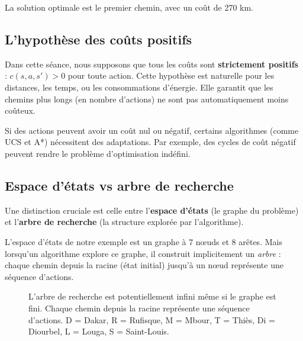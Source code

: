 \documentclass[11pt,a4paper]{article}
\begin{document}
La solution optimale est le premier chemin, avec un coût de 270 km.

\subsection{L'hypothèse des coûts positifs}

Dans cette séance, nous supposons que tous les coûts sont \textbf{strictement positifs} : $c(s, a, s') > 0$ pour toute action. Cette hypothèse est naturelle pour les distances, les temps, ou les consommations d'énergie. Elle garantit que les chemins plus longs (en nombre d'actions) ne sont pas automatiquement moins coûteux.

\begin{attentionbox}
Si des actions peuvent avoir un coût nul ou négatif, certains algorithmes (comme UCS et A*) nécessitent des adaptations. Par exemple, des cycles de coût négatif peuvent rendre le problème d'optimisation indéfini.
\end{attentionbox}

\subsection{Espace d'états vs arbre de recherche}

Une distinction cruciale est celle entre l'\textbf{espace d'états} (le graphe du problème) et l'\textbf{arbre de recherche} (la structure explorée par l'algorithme).

L'espace d'états de notre exemple est un graphe à 7 nœuds et 8 arêtes. Mais lorsqu'un algorithme explore ce graphe, il construit implicitement un \textit{arbre} : chaque chemin depuis la racine (état initial) jusqu'à un nœud représente une séquence d'actions.

\begin{figure}[h]
\centering
{}
\caption{L'arbre de recherche est potentiellement infini même si le graphe est fini. Chaque chemin depuis la racine représente une séquence d'actions. D = Dakar, R = Rufisque, M = Mbour, T = Thiès, Di = Diourbel, L = Louga, S = Saint-Louis.}
\label{fig:arbre}
\end{figure}
\end{document}

